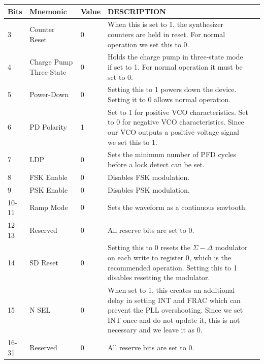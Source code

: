 \label{tab:adf4158-reg-map-3}
\begin{tabularx}{\textwidth}{l l l X>{\raggedright\arraybackslash}X}
        \caption{FUNCTION REGISTER(R3) MAP} \\
        \toprule
        \textbf{Bits} & \textbf{Mnemonic} & \textbf{Value} & \textbf{DESCRIPTION} \\
        \midrule

        \endhead{}

        3 & Counter Reset & 0 & When this is set to 1, the synthesizer counters are held in reset. For
        normal operation we set this to 0. \\
        4 & Charge Pump Three-State & 0 & Holds the charge pump in three-state mode if set to 1. For
        normal operation it must be set to 0. \\
        5 & Power-Down & 0 & Setting this to 1 powers down the device. Setting it to 0 allows normal
        operation. \\
        6 & PD Polarity & 1 & Set to 1 for positive VCO characteristics. Set to 0 for negative VCO
        characteristics. Since our VCO outputs a positive voltage signal we set this
        to 1. \\
        7 & LDP & 0 & Sets the minimum number of PFD cycles before a lock detect can be set. \\
        8 & FSK Enable & 0 & Disables FSK modulation. \\
        9 & PSK Enable & 0 & Disables PSK modulation. \\
        10-11 & Ramp Mode & 0 & Sets the waveform as a continuous sawtooth. \\
        12-13 & Reserved & 0 & All reserve bits are set to 0. \\
        14 & SD Reset & 0 & Setting this to 0 resets the $\Sigma-\Delta$ modulator on each write to
        register 0, which is the recommended operation. Setting this to 1 disables
        resetting the modulator. \\
        15 & N SEL & 0 & When set to 1, this creates an additional delay in setting INT and FRAC which can
        prevent the PLL overshooting. Since we set INT once and do not update it, this is
        not necessary and we leave it as 0. \\
        16-31 & Reserved & 0 & All reserve bits are set to 0. \\

        \bottomrule
\end{tabularx}

